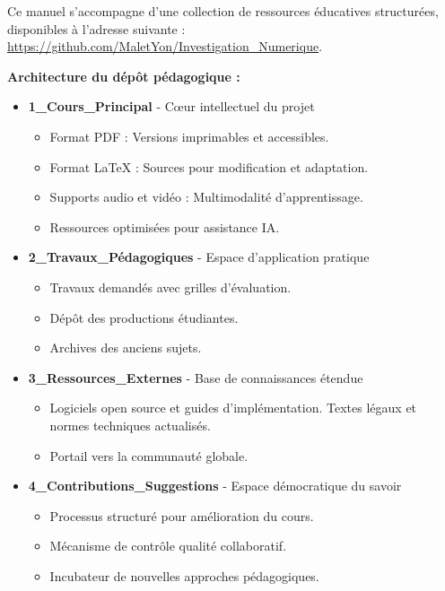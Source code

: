 \documentclass[11pt,a4paper,oneside]{book}
\begin{document}
            \noindent Ce manuel s'accompagne d'une collection de ressources éducatives structurées, disponibles à l'adresse suivante : 
            \url{https://github.com/MaletYon/Investigation_Numerique}.

            \vspace{0.5cm}

            \noindent\textbf{Architecture du dépôt pédagogique :}

            \begin{itemize}
                \item \textbf{1\_Cours\_Principal} - Cœur intellectuel du projet
                \begin{itemize}
                    \item Format PDF : Versions imprimables et accessibles.
                    \item Format LaTeX : Sources pour modification et adaptation.
                    \item Supports audio et vidéo : Multimodalité d'apprentissage.
                    \item Ressources optimisées pour assistance IA.
                \end{itemize}
                
                \item \textbf{2\_Travaux\_Pédagogiques} - Espace d'application pratique
                \begin{itemize}
                    \item Travaux demandés avec grilles d'évaluation.
                    \item Dépôt des productions étudiantes.
                    \item Archives des anciens sujets.
                \end{itemize}
                
                \item \textbf{3\_Ressources\_Externes} - Base de connaissances étendue
                \begin{itemize}
                    \item Logiciels open source et guides d'implémentation.
                    \textitem Textes légaux et normes techniques actualisés.
                    \item Portail vers la communauté globale.
                \end{itemize}
                
                \item \textbf{4\_Contributions\_Suggestions} - Espace démocratique du savoir
                \begin{itemize}
                    \item Processus structuré pour amélioration du cours.
                    \item Mécanisme de contrôle qualité collaboratif.
                    \item Incubateur de nouvelles approches pédagogiques.
                \end{itemize}
                

\end{itemize}
\end{document}
